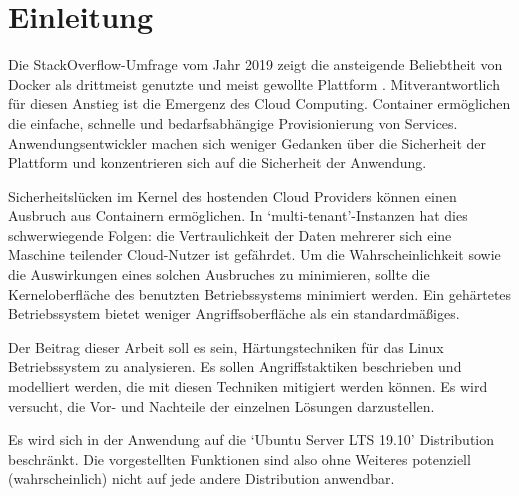 \chapter{Einleitung}

Die StackOverflow-Umfrage vom Jahr 2019 zeigt die ansteigende Beliebtheit von Docker als drittmeist genutzte und meist gewollte Plattform \cite{so-survey-2019}. Mitverantwortlich für diesen Anstieg ist die Emergenz des Cloud Computing. Container ermöglichen die einfache, schnelle und bedarfsabhängige Provisionierung von Services. Anwendungsentwickler machen sich weniger Gedanken über die Sicherheit der Plattform und konzentrieren sich auf die Sicherheit der Anwendung.

Sicherheitslücken im Kernel des hostenden Cloud Providers können einen Ausbruch aus Containern ermöglichen. In `multi-tenant'-Instanzen hat dies schwerwiegende Folgen: die Vertraulichkeit der Daten mehrerer sich eine Maschine teilender Cloud-Nutzer ist gefährdet.
Um die Wahrscheinlichkeit sowie die Auswirkungen eines solchen Ausbruches zu minimieren, sollte die Kerneloberfläche des benutzten Betriebssystems minimiert werden. Ein gehärtetes Betriebssystem bietet weniger Angriffsoberfläche als ein standardmäßiges.

Der Beitrag dieser Arbeit soll es sein, Härtungstechniken für das Linux Betriebssystem zu analysieren. Es sollen Angriffstaktiken beschrieben und modelliert werden, die mit diesen Techniken mitigiert werden können. Es wird versucht, die Vor- und Nachteile der einzelnen Lösungen darzustellen.

Es wird sich in der Anwendung auf die `Ubuntu Server LTS 19.10' Distribution beschränkt. Die vorgestellten Funktionen sind also ohne Weiteres potenziell (wahrscheinlich) nicht auf jede andere Distribution anwendbar.
